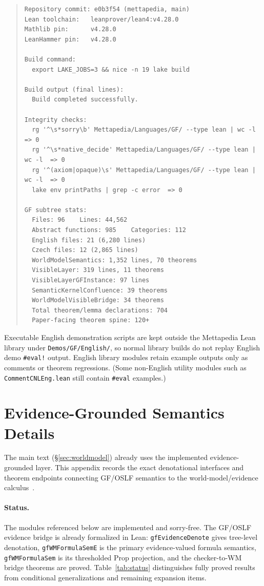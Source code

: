 \documentclass[11pt]{article}
\newcommand{\code}[1]{\texttt{#1}}
\newcommand{\OSLF}{\textup{OSLF}}
\newcommand{\GF}{\textup{GF}}
\begin{document}
\begin{quote}
\small
\begin{verbatim}
Repository commit: e0b3f54 (mettapedia, main)
Lean toolchain:   leanprover/lean4:v4.28.0
Mathlib pin:      v4.28.0
LeanHammer pin:   v4.28.0

Build command:
  export LAKE_JOBS=3 && nice -n 19 lake build

Build output (final lines):
  Build completed successfully.

Integrity checks:
  rg '^\s*sorry\b' Mettapedia/Languages/GF/ --type lean | wc -l  => 0
  rg '^\s*native_decide' Mettapedia/Languages/GF/ --type lean | wc -l  => 0
  rg '^(axiom|opaque)\s' Mettapedia/Languages/GF/ --type lean | wc -l  => 0
  lake env printPaths | grep -c error  => 0

GF subtree stats:
  Files: 96    Lines: 44,562
  Abstract functions: 985    Categories: 112
  English files: 21 (6,280 lines)
  Czech files: 12 (2,865 lines)
  WorldModelSemantics: 1,352 lines, 70 theorems
  VisibleLayer: 319 lines, 11 theorems
  VisibleLayerGFInstance: 97 lines
  SemanticKernelConfluence: 39 theorems
  WorldModelVisibleBridge: 34 theorems
  Total theorem/lemma declarations: 704
  Paper-facing theorem spine: 120+
\end{verbatim}
\end{quote}

\noindent
Executable English demonstration scripts are kept outside the
Mettapedia Lean library under \code{Demos/GF/English/}, so normal
library builds do not replay English demo \code{\#eval!} output.
English library modules retain example outputs only as comments or
theorem regressions.  (Some non-English utility modules such as
\code{CommentCNLEng.lean} still contain \code{\#eval} examples.)

\section{Evidence-Grounded Semantics Details}
\label{app:evidence}
\label{sec:evidence}

The main text (\S\ref{sec:worldmodel}) already uses the implemented
evidence-grounded layer.  This appendix records the exact denotational
interfaces and theorem endpoints connecting \GF{}/\OSLF{} semantics to the
world-model/evidence calculus~\cite{goertzel2009pln}.

\paragraph{Status.}  The modules referenced below are implemented and
sorry-free.  The \GF{}/\OSLF{} evidence bridge is already formalized in Lean:
\code{gfEvidenceDenote} gives tree-level denotation,
\code{gfWMFormulaSemE} is the primary evidence-valued formula semantics,
\code{gfWMFormulaSem} is its thresholded Prop projection, and the checker-to-WM
bridge theorems are proved.  Table~\ref{tab:status} distinguishes fully proved
results from conditional generalizations and remaining expansion items.
\end{document}

